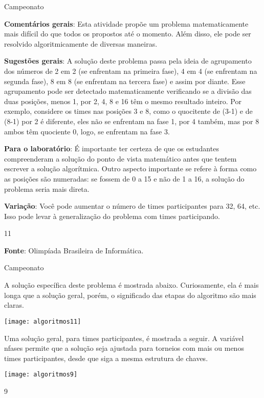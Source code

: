\begin{sugestions}{Campeonato}
{
\textbf{Comentários gerais}: Esta atividade propõe um problema matematicamente mais difícil do que todos os propostos até o momento. Além disso, ele pode ser resolvido algoritmicamente de diversas maneiras.

\textbf{Sugestões gerais}: A solução deste problema passa pela ideia de agrupamento dos números de 2 em 2 (se enfrentam na primeira fase), 4 em 4 (se enfrentam na segunda fase), 8 em 8 (se enfrentam na tercera fase) e assim por diante. Esse agrupamento pode ser detectado matematicamente verificando se a divisão das duas posições, menos 1, por 2, 4, 8 e 16 têm o mesmo resultado inteiro. Por exemplo, considere os times nas posições 3 e 8, como o quocitente de (3-1) e de (8-1) por 2 é diferente, eles não se enfrentam na fase 1, por 4 também, mas por 8 ambos têm quociente 0, logo, se enfrentam na fase 3.

\textbf{Para o laboratório}: É importante ter certeza de que os estudantes compreenderam a solução do ponto de vista matemático antes que tentem escrever a solução algorítmica. Outro aspecto importante se refere à forma como as posições são numeradas: se fossem de 0 a 15 e não de 1 a 16, a solução do problema seria mais direta.

\textbf{Variação}: Você pode aumentar o número de times participantes para 32, 64, etc. Isso pode levar à generalização do problema com  times participando.
}{1}{1}

\textbf{Fonte}: Olimpíada Brasileira de Informática.
\end{sugestions}
\begin{answer}{Campeonato}
{
A solução específica deste problema é mostrada abaixo. Curiosamente, ela é mais longa que a solução geral, porém, o significado das etapas do algoritmo são mais claras.

\centering
\texttt{[image: algoritmos11]}
\justify

Uma solução geral, para  times participantes, é mostrada a seguir. A variável nfases permite que a solução seja ajustada para torneios com mais ou menos times participantes, desde que siga a mesma estrutura de chaves.

\centering
\texttt{[image: algoritmos9]}
}{9}
\end{answer}

